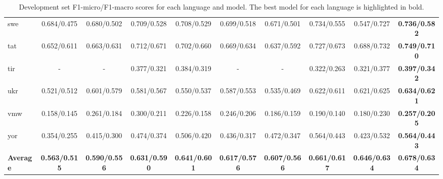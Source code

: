 \documentclass[a4paper,12pt]{extarticle}
\begin{document}
\begin{table}[!th]
\begin{center}
{\begin{tabular}{@{}lccccccccc@{}}
    swe & 0.684/0.475 & 0.680/0.502 & 0.709/0.528 & 0.708/0.529 & 0.699/0.518 & 0.671/0.501 & 0.734/0.555 & 0.547/0.727 & \textbf{0.736/0.582} \\
    tat & 0.652/0.611 & 0.663/0.631 & 0.712/0.671 & 0.702/0.660 & 0.669/0.634 & 0.637/0.592 & 0.727/0.673 & 0.688/0.732 & \textbf{0.749/0.710} \\
    tir & - & - & 0.377/0.321 & 0.384/0.319 & - & - & 0.322/0.263 & 0.321/0.377 & \textbf{0.397/0.342} \\
    ukr & 0.521/0.512 & 0.601/0.579 & 0.581/0.567 & 0.550/0.537 & 0.587/0.553 & 0.535/0.469 & 0.622/0.611 & 0.621/0.625 & \textbf{0.634/0.621} \\
    vmw & 0.158/0.145 & 0.261/0.184 & 0.300/0.211 & 0.226/0.158 & 0.246/0.206 & 0.186/0.159 & 0.190/0.140 & 0.180/0.230 & \textbf{0.257/0.205} \\
    yor & 0.354/0.255 & 0.415/0.300 & 0.474/0.374 & 0.506/0.420 & 0.436/0.317 & 0.472/0.347 & 0.564/0.443 & 0.423/0.532 & \textbf{0.564/0.443} \\ \midrule
    \textbf{Average} & \textbf{0.563/0.515} & \textbf{0.590/0.556} & \textbf{0.631/0.590} & \textbf{0.641/0.601} & \textbf{0.617/0.576} & \textbf{0.607/0.566} & \textbf{0.661/0.617} & \textbf{0.646/0.634} & \textbf{0.678/0.634} \\ \bottomrule
    \end{tabular}
    }
\end{center}
\caption{Development set F1-micro/F1-macro scores for each language and model. The best model for each language is highlighted in bold.}
\label{tab:multilingual_performance}
\end{table}
\end{document}
